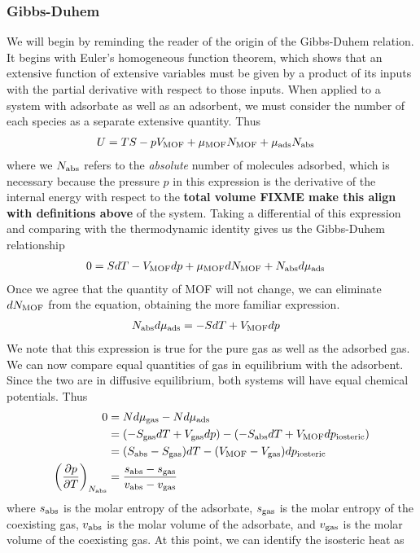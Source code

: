 \documentclass[letterpaper,twocolumn,amsmath,amssymb,jcp,aps,10pt]{revtex4-1}
\begin{document}
\subsubsection{Gibbs-Duhem}
We will begin by reminding the reader of the origin of the Gibbs-Duhem relation.  It begins with Euler's homogeneous function theorem, which shows that an extensive function of extensive variables must be given by a product of its inputs with the partial derivative with respect to those inputs.  When applied to a system with adsorbate as well as an adsorbent, we must consider the number of each species as a separate extensive quantity.  Thus
\begin{align}
    U &= TS - pV_{\text{MOF}} + \mu_{\text{MOF}} N_{\text{MOF}} + \mu_{\text{ads}} N_{\text{abs}}
\end{align}
where we $N_{\text{abs}}$ refers to the \emph{absolute} number of molecules adsorbed, which is necessary because the pressure $p$ in this expression is the derivative of the internal energy with respect to the \textbf{total volume FIXME make this align with definitions above} of the system.
Taking a differential of this expression and comparing with the thermodynamic identity gives us the Gibbs-Duhem relationship
\begin{align}
     0 &= S dT - V_{\text{MOF}} dp + \mu_{\text{MOF}} dN_{\text{MOF}} + N_{\text{abs}} d\mu_{\text{ads}}
\end{align}
Once we agree that the quantity of MOF will not change, we can eliminate $dN_{\text{MOF}}$ from the equation, obtaining the more familiar expression.
\begin{align}
     N_{\text{abs}} d\mu_{\text{ads}} &= -S dT + V_{\text{MOF}} dp
\end{align}
We note that this expression is true for the pure gas as well as the adsorbed gas.  We can now compare equal quantities of gas in equilibrium with the adsorbent.  Since the two are in diffusive equilibrium, both systems will have equal chemical potentials.  Thus
\begin{align}
    0 &= Nd\mu_{\text{gas}} - Nd\mu_{\text{ads}} \\
    &= (-S_{\text{gas}} dT + V_{\text{gas}} dp) - (-S_{\text{abs}} dT + V_{\text{MOF}} dp_{\text{iosteric}}) \\
    &= (S_{\text{abs}} - S_{\text{gas}})dT - (V_{\text{MOF}} - V_{\text{gas}})dp_{\text{iosteric}} \\
    \left(\frac{\partial p}{\partial T}\right)_{N_{\text{abs}}} &= \frac{s_{\text{abs}} - s_{\text{gas}}}{v_{\text{abs}} - v_{\text{gas}}}
\end{align}
where $s_{\text{abs}}$ is the molar entropy of the adsorbate, $s_{\text{gas}}$ is the molar entropy of the coexisting gas, $v_{\text{abs}}$ is the molar volume of the adsorbate, and $v_{\text{gas}}$ is the molar volume of the coexisting gas.  At this point, we can identify the isosteric heat as
\end{document}
